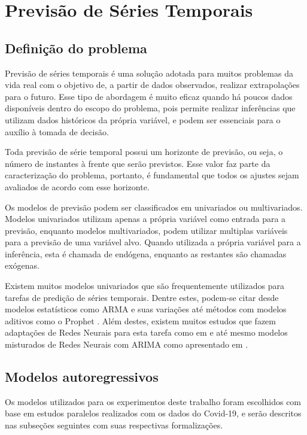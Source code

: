 \chapter{Previsão de Séries Temporais}

\section{Definição do problema}
Previsão de séries temporais é uma solução adotada para muitos problemas da vida real com o objetivo de, a partir de dados observados, realizar extrapolações para o futuro. Esse tipo de abordagem é muito eficaz quando há poucos dados disponíveis dentro do escopo do problema, pois permite realizar inferências que utilizam dados históricos da própria variável, e podem ser essenciais para o auxílio à tomada de decisão.

Toda previsão de série temporal possui um horizonte de previsão, ou seja, o número de instantes à frente que serão previstos. Esse valor faz parte da caracterização do problema, portanto, é fundamental que todos os ajustes sejam avaliados de acordo com esse horizonte.

Os modelos de previsão podem ser classificados em univariados ou multivariados. Modelos univariados utilizam apenas a própria variável como entrada para a previsão, enquanto modelos multivariados, podem utilizar multiplas variáveis para a previsão de uma variável alvo. Quando utilizada a própria variável para a inferência, esta é chamada de endógena, enquanto as restantes são chamadas exógenas.

Existem muitos modelos univariados que são frequentemente utilizados para tarefas de predição de séries temporais. Dentre estes, podem-se citar desde modelos estatísticos como ARMA \cite{box&jenkins} e suas variações \cite{ALZAHRANI2020914} até métodos com modelos aditivos como o Prophet \cite{fbprophet}. Além destes, existem muitos estudos que fazem adaptações de Redes Neurais para esta tarefa como em \cite{ZHANG2005501} e até mesmo modelos misturados de Redes Neurais com ARIMA como apresentado em \cite{ZHANG2003159}.

\section{Modelos autoregressivos}
Os modelos utilizados para os experimentos deste trabalho foram escolhidos com base em estudos paralelos realizados com os dados do Covid-19, e serão descritos nas subseções seguintes com suas respectivas formalizações.
